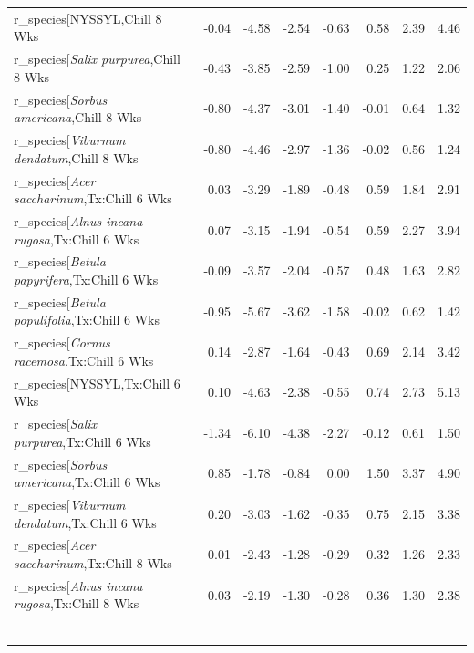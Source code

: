 \documentclass{article}\usepackage[]{graphicx}\usepackage[]{color}
\begin{document}
\begin{longtable}{lrrrrrrr}
  r_species[NYSSYL,Chill 8 Wks & -0.04 & -4.58 & -2.54 & -0.63 & 0.58 & 2.39 & 4.46 \\ 
  r_species[\textit{Salix purpurea},Chill 8 Wks & -0.43 & -3.85 & -2.59 & -1.00 & 0.25 & 1.22 & 2.06 \\ 
  r_species[\textit{Sorbus americana},Chill 8 Wks & -0.80 & -4.37 & -3.01 & -1.40 & -0.01 & 0.64 & 1.32 \\ 
  r_species[\textit{Viburnum dendatum},Chill 8 Wks & -0.80 & -4.46 & -2.97 & -1.36 & -0.02 & 0.56 & 1.24 \\ 
  r_species[\textit{Acer saccharinum},Tx:Chill 6 Wks & 0.03 & -3.29 & -1.89 & -0.48 & 0.59 & 1.84 & 2.91 \\ 
  r_species[\textit{Alnus incana rugosa},Tx:Chill 6 Wks & 0.07 & -3.15 & -1.94 & -0.54 & 0.59 & 2.27 & 3.94 \\ 
  r_species[\textit{Betula papyrifera},Tx:Chill 6 Wks & -0.09 & -3.57 & -2.04 & -0.57 & 0.48 & 1.63 & 2.82 \\ 
  r_species[\textit{Betula populifolia},Tx:Chill 6 Wks & -0.95 & -5.67 & -3.62 & -1.58 & -0.02 & 0.62 & 1.42 \\ 
  r_species[\textit{Cornus racemosa},Tx:Chill 6 Wks & 0.14 & -2.87 & -1.64 & -0.43 & 0.69 & 2.14 & 3.42 \\ 
  r_species[NYSSYL,Tx:Chill 6 Wks & 0.10 & -4.63 & -2.38 & -0.55 & 0.74 & 2.73 & 5.13 \\ 
  r_species[\textit{Salix purpurea},Tx:Chill 6 Wks & -1.34 & -6.10 & -4.38 & -2.27 & -0.12 & 0.61 & 1.50 \\ 
  r_species[\textit{Sorbus americana},Tx:Chill 6 Wks & 0.85 & -1.78 & -0.84 & 0.00 & 1.50 & 3.37 & 4.90 \\ 
  r_species[\textit{Viburnum dendatum},Tx:Chill 6 Wks & 0.20 & -3.03 & -1.62 & -0.35 & 0.75 & 2.15 & 3.38 \\ 
  r_species[\textit{Acer saccharinum},Tx:Chill 8 Wks & 0.01 & -2.43 & -1.28 & -0.29 & 0.32 & 1.26 & 2.33 \\ 
  r_species[\textit{Alnus incana rugosa},Tx:Chill 8 Wks & 0.03 & -2.19 & -1.30 & -0.28 & 0.36 & 1.30 & 2.38 \\ 
   &  &  &  &  &  &  &  \\ 
   &  &  &  &  &  &  &  \\ 
   &  &  &  &  &  &  &  \\ 
   &  &  &  &  &  &  &  \\ 
   &  &  &  &  &  &  &  \\ 
   &  &  &  &  &  &  &  \\ 

\end{longtable}
\end{document}
